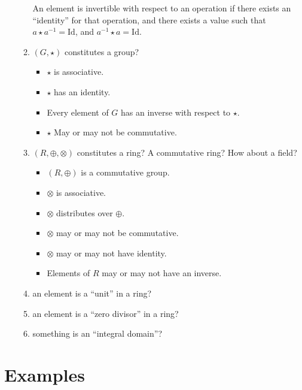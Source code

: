 \documentclass[10pt]{amsart}
\begin{document}
\begin{enumerate}
\begin{enumerate}[listparindent=0.7cm]
        An element is invertible with respect to an operation if there exists
        an ``identity'' for that operation, and there exists a value such that
        $a\star a^{-1}=\text{Id}$, and $a^{-1}\star a=\text{Id}$.
      \item $(G,\star)$ constitutes a group?
        \begin{itemize}
          \item $\star$ is associative.
          \item $\star$ has an identity.
          \item Every element of $G$ has an inverse with respect to $\star$.
          \item $\star$ May or may not be commutative.
        \end{itemize}
      \item $(R,\oplus,\otimes)$ constitutes a ring? A commutative ring? How
        about a field?
        \begin{itemize}
          \item $(R,\oplus)$ is a commutative group.
          \item $\otimes$ is associative.
          \item $\otimes$ distributes over $\oplus$.
          \item $\otimes$ may or may not be commutative.
          \item $\otimes$ may or may not have identity.
          \item Elements of $R$ may or may not have an inverse.
        \end{itemize}
      \item an element is a ``unit'' in a ring?
      \item an element is a ``zero divisor'' in a ring?
      \item something is an ``integral domain''?
    \end{enumerate}
\end{enumerate}

\section{Examples}%
\label{sec:examples}
\end{document}

